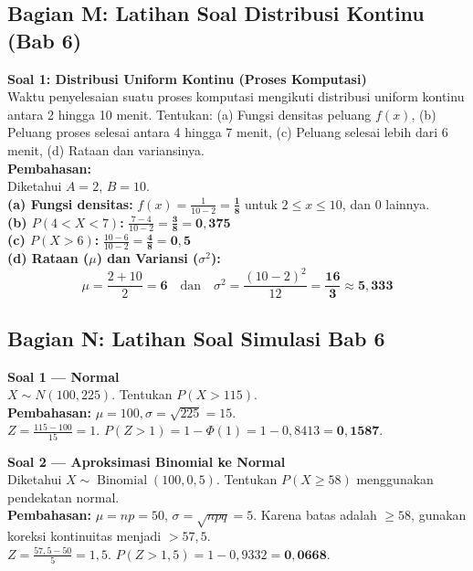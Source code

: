 \documentclass[12pt, a4paper]{article}
\begin{document}
\subsection{Bagian M: Latihan Soal Distribusi Kontinu (Bab 6)}
\textbf{Soal 1: Distribusi Uniform Kontinu (Proses Komputasi)} \\
Waktu penyelesaian suatu proses komputasi mengikuti distribusi uniform kontinu antara 2 hingga 10 menit. Tentukan: (a) Fungsi densitas peluang $f(x)$, (b) Peluang proses selesai antara 4 hingga 7 menit, (c) Peluang selesai lebih dari 6 menit, (d) Rataan dan variansinya. \\
\textbf{Pembahasan:} \\
Diketahui $A = 2$, $B = 10$. \\
\textbf{(a) Fungsi densitas:} $f(x) = \frac{1}{10-2} = \mathbf{\frac{1}{8}}$ untuk $2 \le x \le 10$, dan $0$ lainnya. \\
\textbf{(b) $P(4 < X < 7)$:} $\frac{7-4}{10-2} = \mathbf{\frac{3}{8} = 0{,}375}$ \\
\textbf{(c) $P(X > 6)$:} $\frac{10-6}{10-2} = \mathbf{\frac{4}{8} = 0{,}5}$ \\
\textbf{(d) Rataan ($\mu$) dan Variansi ($\sigma^2$):} \\
$$\mu = \frac{2+10}{2} = \mathbf{6} \quad \text{dan} \quad \sigma^2 = \frac{(10-2)^2}{12} = \mathbf{\frac{16}{3} \approx 5{,}333}$$

\vspace{0.5cm}

\subsection{Bagian N: Latihan Soal Simulasi Bab 6}

\textbf{Soal 1 — Normal} \\
$X \sim N(100, 225)$. Tentukan $P(X > 115)$. \\
\textbf{Pembahasan:} $\mu = 100, \sigma = \sqrt{225} = 15$. \\
$Z = \frac{115-100}{15} = 1$. $P(Z > 1) = 1 - \Phi(1) = 1 - 0{,}8413 = \mathbf{0{,}1587}$.

\textbf{Soal 2 — Aproksimasi Binomial ke Normal} \\
Diketahui $X \sim \operatorname{Binomial}(100, 0{,}5)$. Tentukan $P(X \ge 58)$ menggunakan pendekatan normal. \\
\textbf{Pembahasan:} $\mu = np = 50$, $\sigma = \sqrt{npq} = 5$. Karena batas adalah $\ge 58$, gunakan koreksi kontinuitas menjadi $> 57{,}5$. \\
$Z = \frac{57{,}5 - 50}{5} = 1{,}5$. $P(Z > 1{,}5) = 1 - 0{,}9332 = \mathbf{0{,}0668}$.
\end{document}
